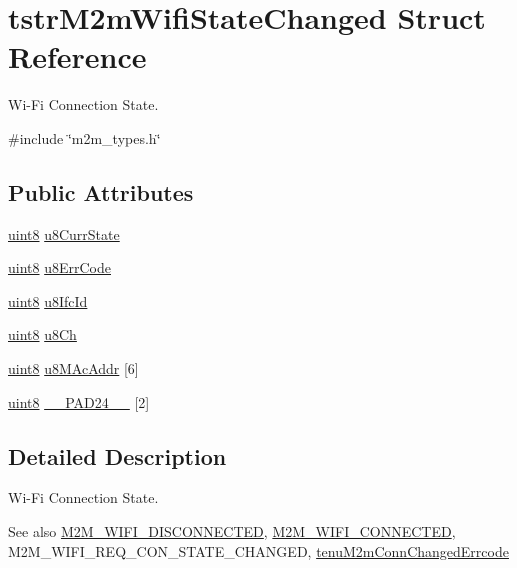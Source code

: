\hypertarget{structtstrM2mWifiStateChanged}{}\section{tstr\+M2m\+Wifi\+State\+Changed Struct Reference}
\label{structtstrM2mWifiStateChanged}


Wi-\/\+Fi Connection State.  




{\ttfamily \#include \char`\"{}m2m\+\_\+types.\+h\char`\"{}}

\subsection*{Public Attributes}
\begin{DoxyCompactItemize}
\item 
\hyperlink{group__DataT_ga4df709a77647e870bbf1d955b8edc9a6}{uint8} \hyperlink{structtstrM2mWifiStateChanged_a8cf6acc2d9640b20629c6b8383534dfa}{u8\+Curr\+State}
\item 
\hyperlink{group__DataT_ga4df709a77647e870bbf1d955b8edc9a6}{uint8} \hyperlink{structtstrM2mWifiStateChanged_a6eec99c8a4c5c0c0db084dfe571507eb}{u8\+Err\+Code}
\item 
\hyperlink{group__DataT_ga4df709a77647e870bbf1d955b8edc9a6}{uint8} \hyperlink{structtstrM2mWifiStateChanged_a51cd59eb757ed24fcbc2dc7e3a0facfb}{u8\+Ifc\+Id}
\item 
\hyperlink{group__DataT_ga4df709a77647e870bbf1d955b8edc9a6}{uint8} \hyperlink{structtstrM2mWifiStateChanged_a655080c0c6634d46c91ffd1399398037}{u8\+Ch}
\item 
\hyperlink{group__DataT_ga4df709a77647e870bbf1d955b8edc9a6}{uint8} \hyperlink{structtstrM2mWifiStateChanged_ac466e48d4812e1b44633f1607d024a1b}{u8\+M\+Ac\+Addr} \mbox{[}6\mbox{]}
\item 
\hyperlink{group__DataT_ga4df709a77647e870bbf1d955b8edc9a6}{uint8} \hyperlink{structtstrM2mWifiStateChanged_a5552fb780ea8255cde75eb1cfae070eb}{\+\_\+\+\_\+\+P\+A\+D24\+\_\+\+\_\+} \mbox{[}2\mbox{]}
\end{DoxyCompactItemize}


\subsection{Detailed Description}
Wi-\/\+Fi Connection State. 

\begin{DoxySeeAlso}{See also}
\hyperlink{group__WlanEnums_gga460c311f58f4c40c3d20eec9e99db586a0c24dd073c9dde02e789858e161f7106}{M2\+M\+\_\+\+W\+I\+F\+I\+\_\+\+D\+I\+S\+C\+O\+N\+N\+E\+C\+T\+ED}, \hyperlink{group__WlanEnums_gga460c311f58f4c40c3d20eec9e99db586a9196649c19ee10e2168e08a5b4785938}{M2\+M\+\_\+\+W\+I\+F\+I\+\_\+\+C\+O\+N\+N\+E\+C\+T\+ED}, M2\+M\+\_\+\+W\+I\+F\+I\+\_\+\+R\+E\+Q\+\_\+\+C\+O\+N\+\_\+\+S\+T\+A\+T\+E\+\_\+\+C\+H\+A\+N\+G\+ED, \hyperlink{group__WlanEnums_ga649d744eaabbf30bce22e30af0eec24d}{tenu\+M2m\+Conn\+Changed\+Errcode} 
\end{DoxySeeAlso}


